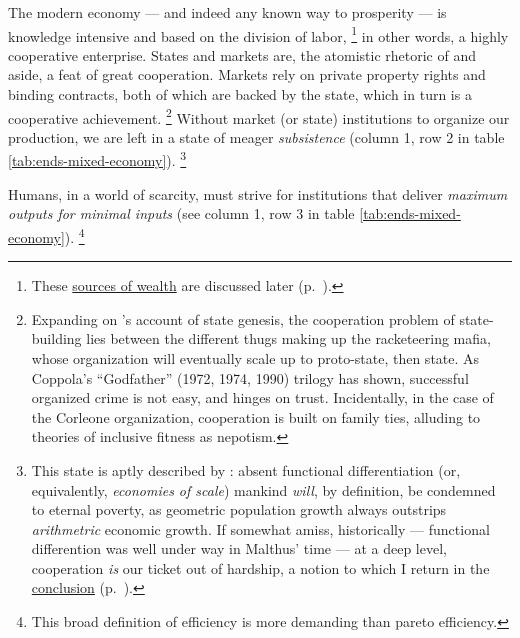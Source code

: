 The modern economy --- and indeed any known way to prosperity --- is knowledge intensive and based on the division of labor,
\footnote{
	These \hyperref[sec:sources-of-wealth]{sources of wealth} are discussed later (p.~\pageref{sec:sources-of-wealth}).
}
in other words, a highly cooperative enterprise.
States and markets are, the atomistic rhetoric of \citeauthor{Hobbes-1651-aa} and \citeauthor{Smith-1776-lq} aside, a feat of great cooperation.
Markets rely on private property rights and binding contracts, both of which are backed by the state, which in turn is a cooperative achievement.
\footnote{
	Expanding on \citeauthor{Tilly-1985-aa}'s account of state genesis, the cooperation problem of state-building lies between the different thugs making up the racketeering mafia, whose organization will eventually scale up to proto-state, then state.
	As Coppola's ``Godfather'' (1972, 1974, 1990) trilogy has shown, successful organized crime is not easy, and hinges on trust.
	Incidentally, in the case of the Corleone organization, cooperation is built on family ties, alluding to theories of inclusive fitness as nepotism.
}
Without market (or state) institutions to organize our production, we are left in a state of meager \emph{subsistence} (column 1, row 2 in table \ref{tab:ends-mixed-economy}).
\footnote{
	This state is aptly described by \cite{Malthus1798}:
	absent functional differentiation (or, equivalently, \emph{economies of scale}) mankind \emph{will}, by definition, be condemned to eternal poverty, as geometric population growth always outstrips \emph{arithmetric} economic growth.
	If somewhat amiss, historically --- functional differention was well under way in Malthus' time --- at a deep level, cooperation \emph{is} our ticket out of hardship, a notion to which I return in the \hyperref[sec:growthsolidarity]{conclusion} (p.~\pageref{sec:growthsolidarity}).
}

Humans, in a world of scarcity, must strive for institutions that deliver \emph{maximum outputs for minimal inputs} (see column 1, row 3 in table \ref{tab:ends-mixed-economy}).
\footnote{
	This broad definition of efficiency is more demanding than pareto efficiency.
}

